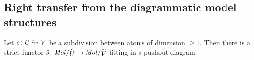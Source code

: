 \subsection{Right transfer from the diagrammatic model structures}

\begin{lem} \label{lem:pushout_with_localisation}
    Let \( s \colon U \looparrowright V \) be a subdivision between atoms of dimension \( \geq 1 \).
    Then there is a strict functor \( \td{s} \colon \molecin{\selfloc{U}} \to \molecin{\selfloc V} \) fitting in a pushout diagram
    \begin{center}
    \end{center}
\end{lem}
